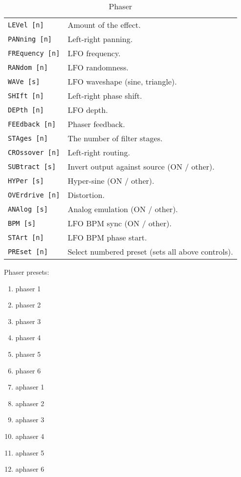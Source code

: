    \begin{table}[H]
      \centering
      \caption{Phaser}
      \begin{tabular}{l l}
\texttt{LEVel [n]} &
   Amount of the effect. \\
\texttt{PANning [n]} &
   Left-right panning. \\
\texttt{FREquency [n]} &
   LFO frequency. \\
\texttt{RANdom [n]} &
   LFO randomness. \\
\texttt{WAVe [s]} &
   LFO waveshape (sine, triangle). \\
\texttt{SHIft [n]} &
   Left-right phase shift. \\
\texttt{DEPth [n]} &
   LFO depth. \\
\texttt{FEEdback [n]} &
   Phaser feedback. \\
\texttt{STAges [n]} &
   The number of filter stages. \\
\texttt{CROssover [n]} &
   Left-right routing. \\
\texttt{SUBtract [s]} &
   Invert output against source (ON / other). \\
\texttt{HYPer [s]} &
   Hyper-sine (ON / other). \\
\texttt{OVErdrive [n]} &
   Distortion. \\
\texttt{ANAlog [s]} &
   Analog emulation  (ON / other). \\
\texttt{BPM [s]} &
   LFO BPM sync (ON / other). \\
\texttt{STArt [n]} &
   LFO BPM phase start. \\
\texttt{PREset [n]} &
   Select numbered preset (sets all above controls). \\
      \end{tabular}
   \end{table}
Phaser presets:
   \begin{enumerate}
   \item phaser 1
   \item phaser 2
   \item phaser 3
   \item phaser 4
   \item phaser 5
   \item phaser 6
   \item aphaser 1
   \item aphaser 2
   \item aphaser 3
   \item aphaser 4
   \item aphaser 5
   \item aphaser 6
   \end{enumerate}

